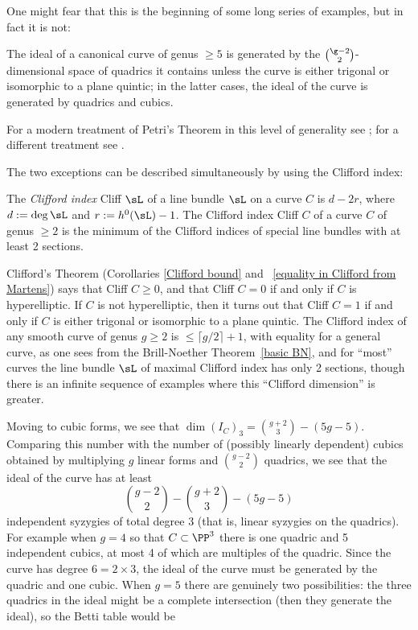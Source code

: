 One might fear that this is the beginning of some long series of examples, but in fact it is not: 

\begin{theorem} [Petri]
The ideal of a canonical curve of genus $\geq 5$ is generated by the $\g-2\choose 2$-dimensional space of quadrics it contains unless the curve is either trigonal or isomorphic to a plane quintic; in the latter cases, the ideal of the curve is generated by quadrics and cubics.
\end{theorem}

For a modern treatment of Petri's Theorem in this level of generality see \cite{Schreyer}; for a different treatment see \cite{Arbarello-Sernesi}.

The two exceptions can be described simultaneously by using the Clifford index:

\begin{definition}
 The \emph{Clifford index} Cliff $\sL$ of a line bundle $\sL$ on a curve $C$ is $d-2r$, where $d := \deg \sL$ and $r :=  h^0(\sL)-1$. The Clifford index Cliff $C$ of
 a curve $C$ of genus $\geq 2$ is the minimum of the Clifford indices of special line bundles with at least 2 sections.
\end{definition}

Clifford's Theorem (Corollaries \ref{Clifford bound} and ~\ref{equality in Clifford from Martens}) says that Cliff $C \geq 0$, and that Cliff $C = 0$ if and only if $C$ is hyperelliptic. If $C$ is not hyperelliptic, then it turns out that Cliff $C=1$ if and only if $C$ is either trigonal or isomorphic to a plane quintic. The Clifford index of any smooth curve of genus $g\geq 2$ is $\leq \lceil g/2\rceil+1$, with equality for a general curve, as one sees from the Brill-Noether Theorem~\ref{basic BN}, and for ``most'' curves the line bundle $\sL$ of maximal Clifford index has only 2 sections, though there is an infinite sequence of examples where this
``Clifford dimension'' is greater.

Moving to cubic forms, we see that $\dim ({I_C})_3 = {g+2\choose 3}-(5g-5)$. Comparing this number with the number of (possibly linearly dependent)
cubics obtained by multiplying $g$ linear forms and ${g-2\choose 2}$ quadrics, we see that the ideal of the curve has at least
$$
{g-2\choose 2} - {g+2\choose 3}-(5g-5) 
$$
independent syzygies of total degree 3 (that is, linear syzygies on the quadrics). For example when $g=4$ so that $C\subset \PP^3$ there is one quadric and 5 independent
cubics, at most 4 of which are multiples of the quadric. Since the curve has degree $6 = 2\times 3$, the ideal of the curve must be generated by
the quadric and one cubic. When $g=5$ there are genuinely two possibilities: the three quadrics in the ideal might be a complete intersection
(then they generate the ideal), so the Betti table would be

